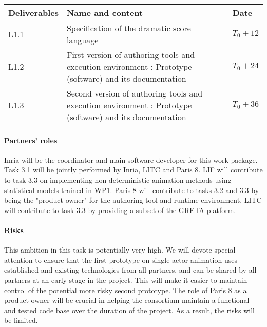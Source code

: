 \begin{tabular}{|l|p{10cm}|l|}\hline
Deliverables & Name and content  & Date  \\\hline
L1.1  & Specification of the dramatic score language &  $T_0+12$   \\\hline
L1.2  & First version of authoring tools and execution environment : Prototype (software) and its documentation &  $T_0+24$  \\\hline
L1.3  & Second version of authoring tools and execution environment : Prototype (software) and its documentation &  $T_0+36$   \\\hline
\end{tabular}

\paragraph{Partners' roles}
Inria will be the coordinator and main software developer for this work package.  Task 3.1 will be jointly performed by Inria, LITC and Paris 8.
LIF will contribute to task 3.3 on implementing non-deterministic animation  methods using statistical models trained in WP1. Paris 8 will contribute 
to tasks 3.2 and 3.3 by being the "product owner" for the authoring tool and runtime environment. LITC will contribute to task   3.3 by providing a subset 
of the GRETA platform.

\paragraph{Risks}
This ambition in this task is potentially very high. We will devote special attention to  ensure that the first prototype on single-actor animation 
uses established and existing  technologies from all partners, and can be shared by all partners at an early stage in the project. This will make
it easier to maintain control of the potential more risky second prototype. The role of Paris 8 as a product owner will be crucial in helping the 
consortium maintain a functional and tested code base over the duration of the project. As a result, the risks will be limited.

\endinput
